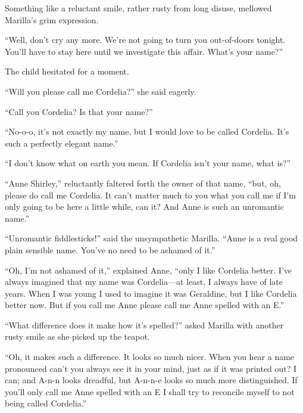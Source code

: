 \documentclass[a4paper]{article}
\begin{document}
{\small Something like a reluctant smile, rather rusty from long disuse, mellowed Marilla's grim expression.

``Well, don't cry any more. We're not going to turn you out-of-doors tonight. You'll have to stay here until we investigate this affair. What's your name?''

The child hesitated for a moment.

``Will you please call me Cordelia?'' she said eagerly.

``Call you Cordelia? Is that your name?''

``No-o-o, it's not exactly my name, but I would love to be called Cordelia. It's such a perfectly elegant name.''

``I don't know what on earth you mean. If Cordelia isn't your name, what is?''

``Anne Shirley,'' reluctantly faltered forth the owner of that name, ``but, oh, please do call me Cordelia. It can't matter much to you what you call me if I'm only going to be here a little while, can it? And Anne is such an unromantic name.''}

{\normalsize ``Unromantic fiddlesticks!'' said the unsympathetic Marilla. ``Anne is a real good plain sensible name. You've no need to be ashamed of it.''

``Oh, I'm not ashamed of it,'' explained Anne, ``only I like Cordelia better. I've always imagined that my name was Cordelia---at least, I always have of late years. When I was young I used to imagine it was Geraldine, but I like Cordelia better now. But if you call me Anne please call me Anne spelled with an E.''

``What difference does it make how it's spelled?'' asked Marilla with another rusty smile as she picked up the teapot.

``Oh, it makes such a difference. It looks so much nicer. When you hear a name pronounced can't you always see it in your mind, just as if it was printed out? I can; and A-n-n looks dreadful, but A-n-n-e looks so much more distinguished. If you'll only call me Anne spelled with an E I shall try to reconcile myself to not being called Cordelia.''}
\end{document}
